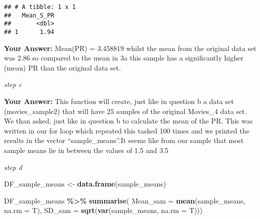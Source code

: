 \documentclass[
]{article}
\newenvironment{Shaded}{\begin{snugshade}}{\end{snugshade}}
\newcommand{\AttributeTok}[1]{\textcolor[rgb]{0.13,0.29,0.53}{#1}}
\newcommand{\ControlFlowTok}[1]{\textcolor[rgb]{0.13,0.29,0.53}{\textbf{#1}}}
\newcommand{\DecValTok}[1]{\textcolor[rgb]{0.00,0.00,0.81}{#1}}
\newcommand{\FunctionTok}[1]{\textcolor[rgb]{0.13,0.29,0.53}{\textbf{#1}}}
\newcommand{\NormalTok}[1]{#1}
\newcommand{\OtherTok}[1]{\textcolor[rgb]{0.56,0.35,0.01}{#1}}
\newcommand{\SpecialCharTok}[1]{\textcolor[rgb]{0.81,0.36,0.00}{\textbf{#1}}}
\begin{document}
\begin{verbatim}
## # A tibble: 1 x 1
##   Mean_S_PR
##       <dbl>
## 1      1.94
\end{verbatim}

\textbf{Your Answer:} Mean(PR) = 3.458819 whilst the mean from the
original data set was 2.86 so compared to the mean in 3a this sample has
a significantly higher (mean) PR than the original data set.

\emph{step c}

\begin{Shaded}
\end{Shaded}

\textbf{Your Answer:} This function will create, just like in question b
a data set (movies\_sample2) that will have 25 samples of the original
Movies\_4 data set. We than asked, just like in question b to calculate
the mean of the PR. This was written in our for loop which repeated this
tasked 100 times and we printed the results in the vector
``sample\_means''.It seems like from our sample that most sample means
lie in between the values of 1.5 and 3.5

\emph{step d}

\begin{Shaded}
\begin{Highlighting}[]
\NormalTok{DF\_sample\_means }\OtherTok{\textless{}{-}} \FunctionTok{data.frame}\NormalTok{(sample\_means)}

\NormalTok{DF\_sample\_means }\SpecialCharTok{\%\textgreater{}\%}
  \FunctionTok{summarise}\NormalTok{(}
    \AttributeTok{Mean\_sam =} \FunctionTok{mean}\NormalTok{(sample\_means, }\AttributeTok{na.rm =}\NormalTok{ T),}
    \AttributeTok{SD\_sam =} \FunctionTok{sqrt}\NormalTok{(}\FunctionTok{var}\NormalTok{(sample\_means, }\AttributeTok{na.rm =}\NormalTok{ T)))}
\end{Highlighting}
\end{Shaded}
\end{document}
